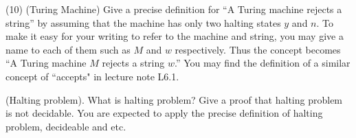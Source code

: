 \documentclass[12pt, letterpaper]{article}
\begin{document}
{{     
 }

  \item (10) (Turing Machine) Give a precise definition for ``A Turing machine rejects a string'' by assuming that the machine has only two halting states $y$ and $n$.  To make it easy for  your writing to refer to the machine and string, you may give a name to each of them such  as $M$ and $w$ respectively. Thus the concept becomes ``A Turing machine $M$ rejects a string $w$.'' You may find the definition of a similar concept of ``accepts" in lecture note L6.1. 
  \item (Halting problem). What is halting problem? Give a proof that halting problem is not decidable. You are expected to apply the precise definition of halting problem, decideable and etc. 
}
\end{document}

